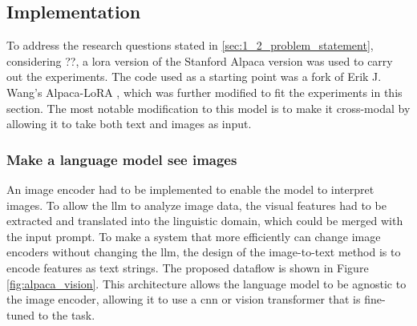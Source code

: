         \subsection{Implementation}
        To address the research questions stated in \ref{sec:1_2_problem_statement}, considering ??, a \gls{lora} version of the Stanford Alpaca version was used to carry out the experiments. The code used as a starting point was a fork of Erik J. Wang's Alpaca-LoRA \cite{wangAlpacaLoRA2023}, which was further modified to fit the experiments in this section. 
        The most notable modification to this model is to make it cross-modal by allowing it to take both text and images as input.


        

        \subsubsection{Make a language model see images}
        An image encoder had to be implemented to enable the model to interpret images. To allow the \gls{llm} to analyze image data, the visual features had to be extracted and translated into the linguistic domain, which could be merged with the input prompt. 
        To make a system that more efficiently can change image encoders without changing the \gls{llm}, the design of the image-to-text method is to encode features as text strings.
        The proposed dataflow is shown in Figure \ref{fig:alpaca_vision}. This architecture allows the language model to be agnostic to the image encoder, allowing it to use a \gls{cnn} or vision transformer that is fine-tuned to the task.

